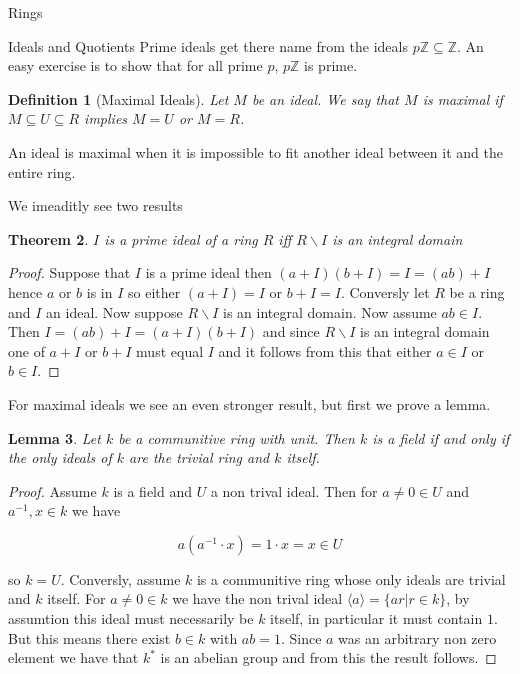 \documentclass[11pt]{report}
\newcommand{\Z}{\mathbb{Z}}
\newcommand{\B }{\backslash}
\theoremstyle{break}
\newtheorem{thm}{Theorem}[section]
\newtheorem{defn}[thm]{Definition}
\newtheorem{lem}[thm]{Lemma}
\begin{document}
\begin{chapter}{Rings}
\begin{section}{Ideals and Quotients}
    Prime ideals get there name from the ideals $p\Z \subseteq \Z$. An easy exercise is to show that for all prime $p$, $p\Z$ is prime. 

    \begin{defn}[Maximal Ideals]
        Let $M$ be an ideal. We say that $M$ is maximal if $M \subseteq U \subseteq R$ implies $M = U$ or $M = R$. 
    \end{defn}
    An ideal is maximal when it is impossible to fit another ideal between it and the entire ring. 

    We imeaditly see two results 

    
    \begin{thm}
        $I$ is a prime ideal of a ring $R$ iff $R\B  I$ is an integral domain 
    \end{thm}

    \begin{proof}
        Suppose that $I$ is a prime ideal then  $(a + I)(b + I) = I = (ab) + I$ hence $a$ or $b$ is in $I$ so either $(a + I) = I$ or 
        $b + I = I$. Conversly let $R$ be a ring and $I$ an ideal. Now suppose $R\B  I$ is an integral domain. Now assume $ab \in I$. 
        Then $I = (ab) + I = (a + I)(b + I)$ and since $R\B  I$ is an integral domain one of $a + I$ or $b + I$ must equal $I$ and it follows 
        from this that either $a \in I$ or $b \in I$. 
    \end{proof}

    For maximal ideals we see an even stronger result, but first we prove a lemma. 
    
    \begin{lem}
        Let $k$ be a communitive ring with unit. Then $k$ is a field if and only if the only ideals 
        of $k$ are the trivial ring and $k$ itself. 
    \end{lem}

    \begin{proof}
        Assume $k$ is a field and $U$ a non trival ideal. Then for $a \neq 0 \in U$ and $a^{-1}, x \in k$ 
        we have 

        \[a(a^{-1} \cdot x) = 1 \cdot x  = x\in U \]

        so $k = U$. Conversly, assume $k$ is a communitive ring whose only ideals are 
        trivial and $k$ itself. For $a \neq 0 \in k$ we have the non trival ideal $\langle a \rangle = \{ar | r \in k\}$, 
        by assumtion this ideal must necessarily be $k$ itself, in particular it must contain $1$. But this means 
        there exist $b \in k$ with $ab = 1$. Since $a$ was an arbitrary non zero element we have that $k^*$ is an 
        abelian group and from this the result follows. 
    \end{proof}


\end{section}
\end{chapter}
\end{document}
